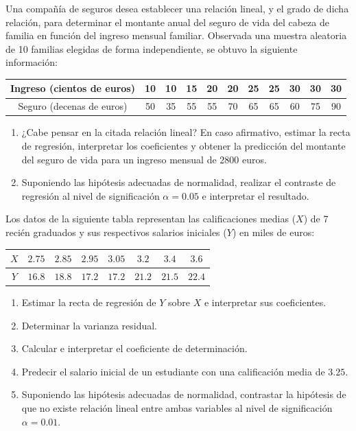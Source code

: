 \begin{ejercicio}
    Una compañía de seguros desea establecer una relación lineal, y el grado de dicha relación, para determinar el montante anual del seguro de vida del cabeza de familia en función del ingreso mensual familiar. Observada una muestra aleatoria de 10 familias elegidas de forma independiente, se obtuvo la siguiente información:
    \begin{table}[H]
    \centering
    \begin{tabular}{c|cccccccccc}
        Ingreso (cientos de euros)  & 10 & 10 & 15 & 20 & 20 & 25 & 25 & 30 & 30 & 30 \\
        \hline
        Seguro (decenas de euros) & 50 & 35 & 55 & 55 & 70 & 65 & 65 & 60 & 75 & 90
    \end{tabular}
    \end{table}
    \begin{enumerate}[label=\alph*)]
        \item ¿Cabe pensar en la citada relación lineal? En caso afirmativo, estimar la recta de regresión, interpretar los coeficientes y obtener la predicción del montante del seguro de vida para un ingreso mensual de 2800 euros.
        \item Suponiendo las hipótesis adecuadas de normalidad, realizar el contraste de regresión al nivel de significación $\alpha = 0.05$ e interpretar el resultado.
    \end{enumerate}
\end{ejercicio}

\begin{ejercicio}
    Los datos de la siguiente tabla representan las calificaciones medias ($X$) de 7 recién graduados y sus respectivos salarios iniciales ($Y$) en miles de euros:
    \begin{table}[H]
    \centering
    \begin{tabular}{c|ccccccc}
        $X$ & $2.75$ & $2.85$ & $2.95$ & $3.05$ & $3.2$ & $3.4$ & $3.6$ \\
        \hline
        $Y$ & $16.8$ & $18.8$ & $17.2$ & $17.2$ & $21.2$ & $21.5$ & $22.4$
    \end{tabular}
    \end{table}
    \begin{enumerate}[label=\alph*)]
        \item Estimar la recta de regresión de $Y$ sobre $X$ e interpretar sus coeficientes.
        \item Determinar la varianza residual.
        \item Calcular e interpretar el coeficiente de determinación.
        \item Predecir el salario inicial de un estudiante con una calificación media de $3.25$.
        \item Suponiendo las hipótesis adecuadas de normalidad, contrastar la hipótesis de que no existe relación lineal entre ambas variables al nivel de significación $\alpha = 0.01$.
    \end{enumerate}
\end{ejercicio}

